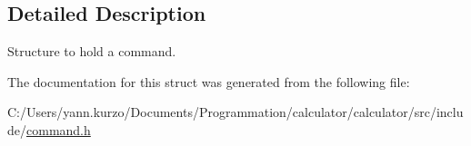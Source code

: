 \subsection{Detailed Description}
Structure to hold a command. 

The documentation for this struct was generated from the following file\+:\begin{DoxyCompactItemize}
\item 
C\+:/\+Users/yann.\+kurzo/\+Documents/\+Programmation/calculator/calculator/src/include/\hyperlink{command_8h}{command.\+h}\end{DoxyCompactItemize}
